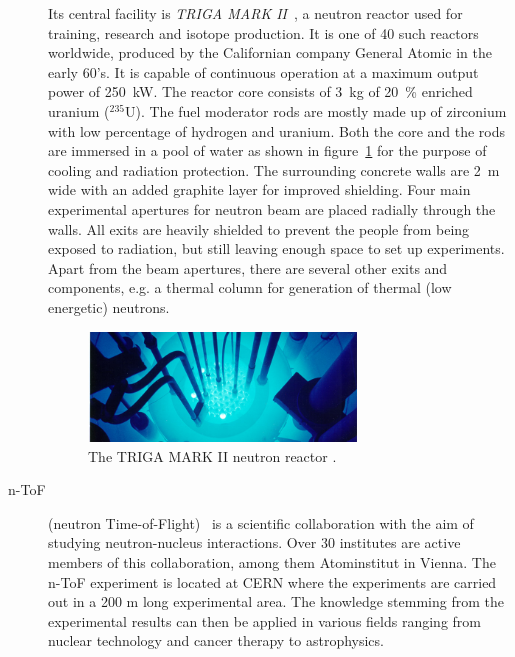 \begin{description}
Its central facility is \emph{TRIGA MARK II}~\cite{Triga:00000}, a neutron reactor used for training, research and isotope production. It is one of 40 such reactors worldwide, produced by the Californian company General Atomic in the early 60's. It is capable of continuous operation at a maximum output power of 250~kW. 
The reactor core consists of 3~kg of 20~\% enriched uranium ($^{235}$U). The fuel moderator rods are mostly made up of zirconium with low percentage of hydrogen and uranium. Both the core and the rods are immersed in a pool of water as shown in figure~\ref{fig:triga} for the purpose of cooling and radiation protection. The surrounding concrete walls are 2~m wide with an added graphite layer for improved shielding. Four main experimental apertures for neutron beam are placed radially through the walls. All exits are heavily shielded to prevent the people from being exposed to radiation, but still leaving enough space to set up experiments. Apart from the beam apertures, there are several other exits and components, e.g. a thermal column for generation of thermal (low energetic) neutrons.

\begin{figure}[!t]
\centering
\includegraphics[width=0.7\textwidth]{01_introduction/pics/triga}
\caption{The TRIGA MARK II neutron reactor \cite{GeneralAtomics}.}
\label{fig:triga}
\end{figure}




\item[n-ToF] (neutron Time-of-Flight)~\cite{NTOF:00000} is a scientific collaboration with the aim of studying neutron-nucleus interactions. Over 30 institutes are active members of this collaboration, among them Atominstitut in Vienna. The n-ToF experiment is located at CERN where the experiments are carried out in a 200 m long experimental area. The knowledge stemming from the experimental results can then be applied in various fields ranging from nuclear technology and cancer therapy to astrophysics.


\end{description}
